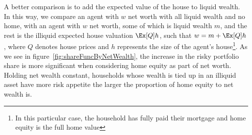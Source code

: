 A better comparison is to add the expected value of the house to liquid wealth. In this way, we compare an agent with $w$ net worth with all liquid wealth and no home, with an agent with $w$ net worth, some of which is liquid wealth $m$, and the rest is the illiquid expected house valuation $\Ex[Q]h$,  such that $w = m + \Ex[Q]h$, where $Q$ denotes house prices and $h$ represents the size of the agent's house\footnote{In this particular case, the household has fully paid their mortgage and home equity is the full home value}. As we see in figure~\ref{fig:shareFuncByNetWealth}, the increase in the risky portfolio share is more significant when considering home equity as part of net worth. Holding net wealth constant, households whose wealth is tied up in an illiquid asset have more risk appetite the larger the proportion of home equity to net wealth is.

\renewcommand{\figName}{shareFuncByNetWealth}
\renewcommand{\figFile}{\figName}

